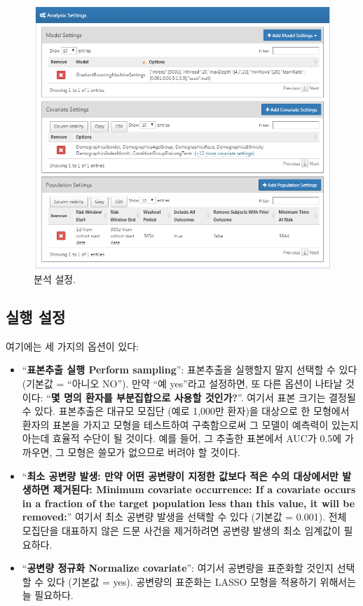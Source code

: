 \documentclass[10.5pt]{book}
\providecommand{\tightlist}{%
  \setlength{\itemsep}{0pt}\setlength{\parskip}{0pt}}
\theoremstyle{definition}
\theoremstyle{definition}
\theoremstyle{definition}
\theoremstyle{remark}
\begin{document}
\begin{figure}

{\centering \includegraphics[width=1\linewidth]{images/PatientLevelPrediction/analysisSettings} 

}

\caption{분석 설정.}\label{fig:analysisSettings}
\end{figure}

\subsection{실행 설정}\label{-}

여기에는 세 가지의 옵션이 있다:

\begin{itemize}
\tightlist
\item
  ``\textbf{표본추출 실행 Perform sampling}'': 표본추출을 실행할지 말지
  선택할 수 있다 (기본값 = ``아니오 NO''). 만약 ``예 yes''라고 설정하면,
  또 다른 옵션이 나타날 것이다: ``\textbf{몇 명의 환자를 부분집합으로
  사용할 것인가?}''. 여기서 표본 크기는 결정될 수 있다. 표본추출은
  대규모 모집단 (예로 1,000만 환자)을 대상으로 한 모형에서 환자의 표본을
  가지고 모형을 테스트하여 구축함으로써 그 모델이 예측력이 있는지 아는데
  효율적 수단이 될 것이다. 예를 들어, 그 추출한 표본에서 AUC가 0.5에
  가까우면, 그 모형은 쓸모가 없으므로 버려야 할 것이다.
\item
  ``\textbf{최소 공변량 발생: 만약 어떤 공변량이 지정한 값보다 적은 수의
  대상에서만 발생하면 제거된다: Minimum covariate occurrence: If a
  covariate occurs in a fraction of the target population less than this
  value, it will be removed:}'' 여기서 최소 공변량 발생을 선택할 수 있다
  (기본값 = 0.001). 전체 모집단을 대표하지 않은 드문 사건을 제거하려면
  공변량 발생의 최소 임계값이 필요하다.
\item
  ``\textbf{공변량 정규화 Normalize covariate}'': 여기서 공변량을
  표준화할 것인지 선택할 수 있다 (기본값 = yes). 공변량의 표준화는 LASSO
  모형을 적용하기 위해서는 늘 필요하다.
\end{itemize}
\end{document}
